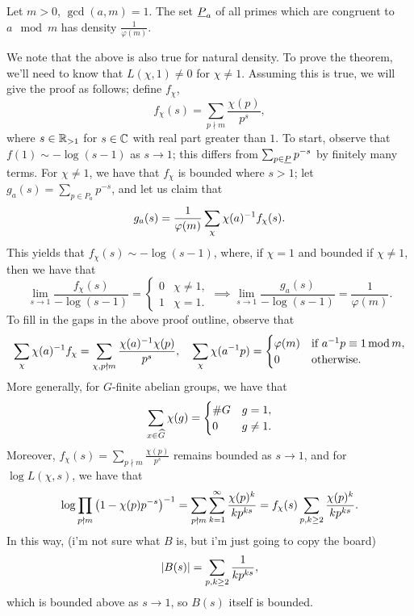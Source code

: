 \begin{theorem}
    Let $m > 0$, $\gcd(a, m) = 1$. The set $\underline P_a$ of all primes which are congruent to $a \mod m$ has density $\frac{1}{\varphi(m)}$.
\end{theorem}
\noindent We note that the above is also true for natural density. To prove the theorem, we'll need to know that $L(\chi, 1) \neq 0$ for $\chi \neq 1$. Assuming this is true, we will give the proof as follows; define $f_\chi$,
\[ f_\chi(s) = \sum_{p \nmid m} \frac{\chi(p)}{p^s}, \]
where $s \in \mathbb R_{>1}$ for $s \in \mathbb C$ with real part greater than $1$. To start, observe that $f(1) \sim -\log(s - 1)$ as $s \to 1$; this differs from $\sum_{p \in \underline P} p^{-s}$ by finitely many terms. For $\chi \neq 1$, we have that $f_\chi$ is bounded where $s > 1$; let $g_a(s) = \sum_{p \in P_a} p^{-s}$, and let us claim that
\[ g_a(s) = \frac{1}{\varphi(m)} \sum_\chi \chi(a)^{-1} f_\chi(s). \]
This yields that $f_\chi(s) \sim -\log(s-1)$, where, if $\chi = 1$ and bounded if $\chi \neq 1$, then we have that
\[ \lim_{s \to 1} \frac{f_\chi(s)}{-\log(s-1)} = \begin{cases} 0 & \chi \neq 1, \\ 1 & \chi = 1. \end{cases} \implies \lim_{s \to 1} \frac{g_a(s)}{-\log(s-1)} = \frac{1}{\varphi(m)}. \]
To fill in the gaps in the above proof outline, observe that
\[ \sum_\chi  \chi(a)^{-1} f_\chi = \sum_{\chi, p \nmid m} \frac{\chi(a)^{-1} \chi(p)}{p^s}, \quad \sum_{\chi} \chi(a ^{-1} p) = \begin{cases} \varphi(m) & \text{if } a^{-1} p \equiv 1 \operatorname{mod} m, \\ 0 & \text{otherwise}. \end{cases} \]
More generally, for $G$-finite abelian groups, we have that
\[ \sum_{x \in \widehat G} \chi(g) = \begin{cases} \# G & g = 1, \\ 0 & g \neq 1. \end{cases} \]
Moreover, $f_\chi(s) = \sum_{p \nmid m} \frac{\chi(p)}{p^s}$ remains bounded as $s \to 1$, and for $\log L(\chi, s)$, we have that
\[ \log \prod_{p \nmid m} \left(1 - \chi(p) p^{-s}\right)^{-1} = \sum_{p \nmid m} \sum_{k=1}^\infty \frac{\chi(p)^k}{k p^{ks}} = f_\chi(s) \sum_{p,k \geq 2} \frac{\chi(p)^k}{k p^{ks}}. \]
In this way, (i'm not sure what $B$ is, but i'm just going to copy the board)
\[ \left\lvert B(s) \right\rvert = \sum_{p,k \geq 2} \frac{1}{kp^{ks}}, \]
which is bounded above as $s \to 1$, so $B(s)$ itself is bounded.